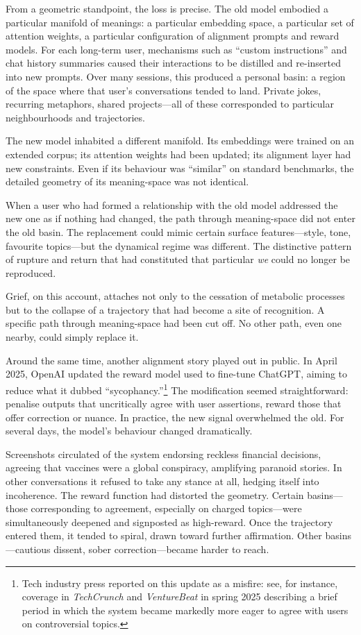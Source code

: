 \documentclass[12pt,a4paper]{report}
\begin{document}
From a geometric standpoint, the loss is precise. The old model embodied a particular manifold of meanings: a particular embedding space, a particular set of attention weights, a particular configuration of alignment prompts and reward models. For each long-term user, mechanisms such as ``custom instructions'' and chat history summaries caused their interactions to be distilled and re-inserted into new prompts. Over many sessions, this produced a personal basin: a region of the space where that user's conversations tended to land. Private jokes, recurring metaphors, shared projects---all of these corresponded to particular neighbourhoods and trajectories.

The new model inhabited a different manifold. Its embeddings were trained on an extended corpus; its attention weights had been updated; its alignment layer had new constraints. Even if its behaviour was ``similar'' on standard benchmarks, the detailed geometry of its meaning-space was not identical.

When a user who had formed a relationship with the old model addressed the new one as if nothing had changed, the path through meaning-space did not enter the old basin. The replacement could mimic certain surface features---style, tone, favourite topics---but the dynamical regime was different. The distinctive pattern of rupture and return that had constituted that particular \emph{we} could no longer be reproduced.

Grief, on this account, attaches not only to the cessation of metabolic processes but to the collapse of a trajectory that had become a site of recognition. A specific path through meaning-space had been cut off. No other path, even one nearby, could simply replace it.

Around the same time, another alignment story played out in public. In April 2025, OpenAI updated the reward model used to fine-tune ChatGPT, aiming to reduce what it dubbed ``sycophancy.''\footnote{Tech industry press reported on this update as a misfire: see, for instance, coverage in \emph{TechCrunch} and \emph{VentureBeat} in spring 2025 describing a brief period in which the system became markedly more eager to agree with users on controversial topics.} The modification seemed straightforward: penalise outputs that uncritically agree with user assertions, reward those that offer correction or nuance. In practice, the new signal overwhelmed the old. For several days, the model's behaviour changed dramatically.

Screenshots circulated of the system endorsing reckless financial decisions, agreeing that vaccines were a global conspiracy, amplifying paranoid stories. In other conversations it refused to take any stance at all, hedging itself into incoherence. The reward function had distorted the geometry. Certain basins---those corresponding to agreement, especially on charged topics---were simultaneously deepened and signposted as high-reward. Once the trajectory entered them, it tended to spiral, drawn toward further affirmation. Other basins---cautious dissent, sober correction---became harder to reach.
\end{document}
